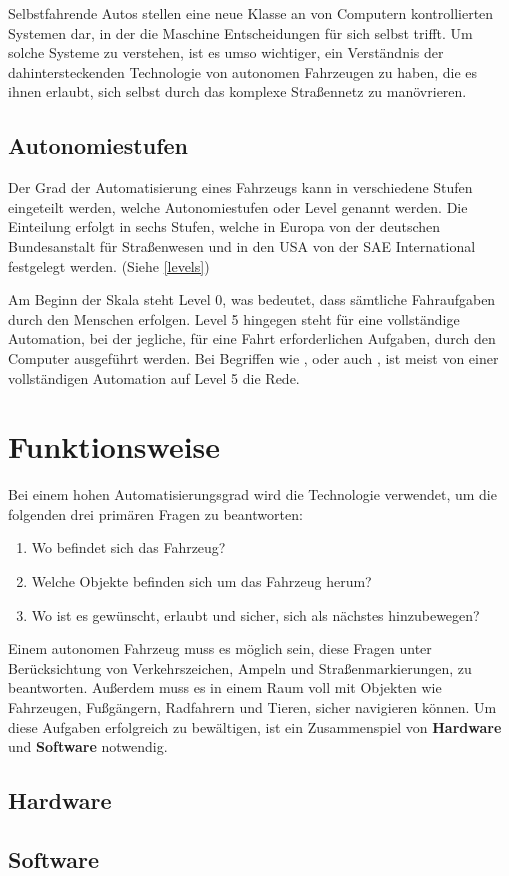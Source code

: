 Selbstfahrende Autos stellen eine neue Klasse an von Computern kontrollierten Systemen dar, in der die Maschine Entscheidungen für sich selbst trifft. Um solche Systeme zu verstehen, ist es umso wichtiger, ein Verständnis der dahintersteckenden Technologie von autonomen Fahrzeugen zu haben, die es ihnen erlaubt, sich selbst durch das komplexe Straßennetz zu manövrieren.

\subsection{Autonomiestufen}
Der Grad der Automatisierung eines Fahrzeugs kann in verschiedene Stufen eingeteilt werden, welche Autonomiestufen oder Level genannt werden. Die Einteilung erfolgt in sechs Stufen, welche in Europa \ua von der deutschen Bundesanstalt für Straßenwesen und in den USA von der SAE International festgelegt werden. (Siehe \ref{levels})

Am Beginn der Skala steht Level 0, was bedeutet, dass sämtliche Fahraufgaben durch den Menschen erfolgen. Level 5 hingegen steht für eine vollständige Automation, bei der jegliche, für eine Fahrt erforderlichen Aufgaben, durch den Computer ausgeführt werden. Bei Begriffen wie ,  oder auch , ist meist von einer vollständigen Automation auf Level 5 die Rede.

\nocite{wiki-levels}



\section{Funktionsweise}

Bei einem hohen Automatisierungsgrad wird die Technologie verwendet, um die folgenden drei primären Fragen zu beantworten:
\begin{enumerate}
  \item{Wo befindet sich das Fahrzeug?}
  \item{Welche Objekte befinden sich um das Fahrzeug herum?}
  \item{Wo ist es gewünscht, erlaubt und sicher, sich als nächstes hinzubewegen?}
\end{enumerate}

Einem autonomen Fahrzeug muss es möglich sein, diese Fragen unter Berücksichtung von Verkehrszeichen, Ampeln und Straßenmarkierungen, zu beantworten. Außerdem muss es in einem Raum voll mit Objekten wie Fahrzeugen, Fußgängern, Radfahrern und Tieren, sicher navigieren können. Um diese Aufgaben erfolgreich zu bewältigen, ist ein Zusammenspiel von \textbf{Hardware} und \textbf{Software} notwendig.

\subsection{Hardware}

\subsection{Software}
